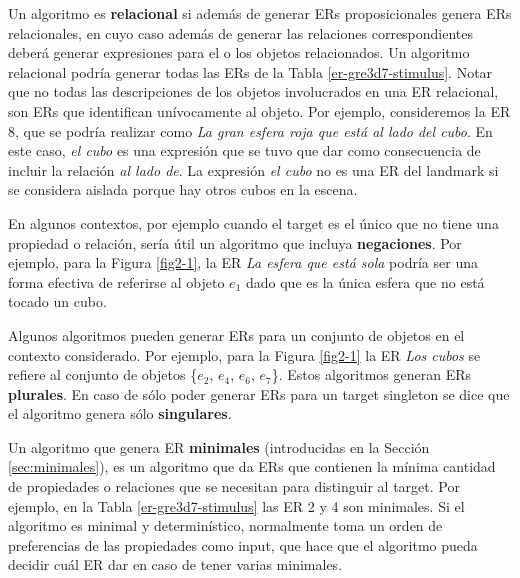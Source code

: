 Un algoritmo es {\bf relacional} si adem\'as de generar ERs proposicionales genera ERs relacionales, en cuyo caso adem\'as de generar las relaciones correspondientes deber\'a generar expresiones para el o los objetos relacionados. Un algoritmo relacional podr\'ia generar todas las ERs de la Tabla \ref{er-gre3d7-stimulus}. Notar que no todas las descripciones de los objetos involucrados en una ER relacional, son ERs que identifican un\'ivocamente al objeto. Por ejemplo, consideremos la ER 8, que se podr\'ia realizar como {\it La gran esfera roja que est\'a al lado del cubo}. En este caso, {\it el cubo} es una expresi\'on que se tuvo que dar como consecuencia de incluir la relaci\'on {\it al lado de}. La expresi\'on {\it el cubo} no es una ER del landmark si se considera aislada porque hay otros cubos en la escena. 

En algunos contextos, por ejemplo cuando el target es el \'unico que no tiene una propiedad o relaci\'on, ser\'ia \'util un algoritmo que incluya {\bf negaciones}. Por ejemplo, para la Figura \ref{fig2-1}, la ER {\it La esfera que est\'a sola} podr\'ia ser 
una forma efectiva de referirse al objeto $e_1$ dado que es la \'unica esfera que no est\'a tocado un cubo.

Algunos algoritmos pueden generar ERs para un conjunto de objetos en el contexto considerado. Por ejemplo, para la Figura \ref{fig2-1} la ER {\it Los cubos} se refiere  al conjunto de objetos \{$e_2$, $e_4$, $e_6$, $e_7$\}. Estos algoritmos generan ERs {\bf plurales}. En caso de s\'olo poder generar ERs para un target singleton se dice que el algoritmo genera s\'olo {\bf singulares}.

Un algoritmo que genera ER {\bf minimales} (introducidas en la Secci\'on \ref{sec:minimales}), es un algoritmo que da ERs que contienen la m\'inima cantidad de propiedades o relaciones que se necesitan para distinguir al target. Por ejemplo, en la Tabla \ref{er-gre3d7-stimulus} las ER 2 y 4 son minimales. Si el algoritmo es minimal y determin\'istico, normalmente toma un orden de preferencias de las propiedades como input, que hace que el algoritmo pueda decidir cu\'al ER dar en caso de tener varias minimales.

